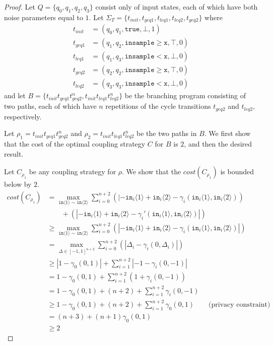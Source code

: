 \documentclass[12pt]{article}
\newcommand{\gguard}[1][x]{\texttt{insample}\geq #1}
\newcommand{\lguard}[1][x]{\texttt{insample} < #1}
\newcommand{\brangle}[1]{\langle #1 \rangle}
\theoremstyle{definition}
\begin{document}
\begin{proof}
    Let $Q = \{q_0, q_1, q_2, q_3\}$ consist only of input states, each of which have both noise parameters equal to $1$. Let $\Sigma_T = \{t_{init}, t_{geq1}, t_{leq1}, t_{leq2}, t_{geq2}\}$ where 
    \begin{align*}
        t_{init} &= (q_0, q_1, \texttt{true}, \bot, 1)\\
        t_{geq1} &= (q_1, q_2, \gguard[\texttt{x}], \top, 0)\\
        t_{leq1} &= (q_1, q_3, \lguard[\texttt{x}], \bot, 0)\\
        t_{geq2} &= (q_2, q_2, \gguard[\texttt{x}], \top, 0)\\
        t_{leq2} &= (q_3, q_3, \lguard[\texttt{x}], \bot, 0)
    \end{align*}
    and let $B = \{t_{init}t_{geq1}t_{geq2}^n, t_{init}t_{leq1}t_{leq2}^n\}$ be the branching program consisting of two paths, each of which have $n$ repetitions of the cycle transitions $t_{geq2}$ and $t_{leq2}$, respectively.

    Let $\rho_1 = t_{init}t_{geq1}t_{geq2}^n$ and $\rho_2 = t_{init}t_{leq1}t_{leq2}^n$ be the two paths in $B$. We first show that the cost of the optimal coupling strategy $C$ for $B$ is $2$, and then the desired result. 
    
    
    Let $C_{\rho_1}$ be any coupling strategy for $\rho$. We show that the $cost(C_{\rho_1})$ is bounded below by $2$. 
    \begin{align*}
        cost(C_{\rho_1}) &= \max_{\texttt{in}\brangle{1}\sim\texttt{in}\brangle{2}}\sum_{i=0}^{n+2}(|-\texttt{in}_i\brangle{1}+\texttt{in}_i\brangle{2}-\gamma_i(\texttt{in}_i\brangle{1}, \texttt{in}_i\brangle{2}))\\&\qquad+(|-\texttt{in}_i\brangle{1}+\texttt{in}_i\brangle{2}-\gamma_i'(\texttt{in}_i\brangle{1}, \texttt{in}_i\brangle{2})|)\\
        &\geq \max_{\texttt{in}\brangle{1}\sim\texttt{in}\brangle{2}} \sum_{i=0}^{n+2}(|-\texttt{in}_i\brangle{1}+\texttt{in}_i\brangle{2}-\gamma_i(\texttt{in}_i\brangle{1}, \texttt{in}_i\brangle{2})|)\\
        &= \max_{\Delta \in [-1, 1]^{n+2}} \sum_{i=0}^{n+2}(|\Delta_i-\gamma_i(0, \Delta_i)|)\\
        &\geq |1 - \gamma_0(0, 1)| + \sum_{i=1}^{n+2}|-1-\gamma_i(0, -1)|\\
        &= 1 - \gamma_0(0, 1) + \sum_{i=1}^{n+2} (1+\gamma_i(0, -1))\\
        &= 1 - \gamma_0(0, 1) + (n + 2) + \sum_{i=1}^{n+2}\gamma_i(0, -1)\\
        &\geq 1 - \gamma_0(0, 1) + (n + 2) + \sum_{i=1}^{n+2}\gamma_0(0, 1) \qquad \text{(privacy constraint)}\\
        &= (n + 3) + (n + 1) \gamma_0(0, 1)\\
        &\geq 2
    \end{align*}


\end{proof}
\end{document}
